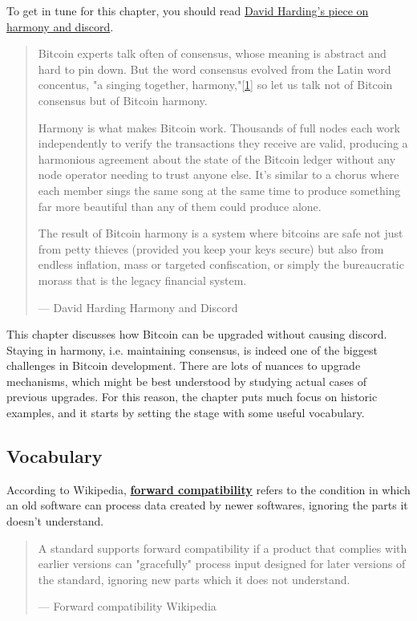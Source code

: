 To get in tune for this chapter, you should read
\href{https://bitcointalk.org/dec/p1.html}{David Harding's piece on
harmony and discord}.

\begin{quote}
Bitcoin experts talk often of consensus, whose meaning is abstract and
hard to pin down. But the word consensus evolved from the Latin word
concentus, "a singing together,
harmony,"{[}\href{https://bitcointalk.org/dec/p1.html\#ftnt1}{1}{]} so
let us talk not of Bitcoin consensus but of Bitcoin harmony.

Harmony is what makes Bitcoin work. Thousands of full nodes each work
independently to verify the transactions they receive are valid,
producing a harmonious agreement about the state of the Bitcoin ledger
without any node operator needing to trust anyone else. It's similar to
a chorus where each member sings the same song at the same time to
produce something far more beautiful than any of them could produce
alone.

The result of Bitcoin harmony is a system where bitcoins are safe not
just from petty thieves (provided you keep your keys secure) but also
from endless inflation, mass or targeted confiscation, or simply the
bureaucratic morass that is the legacy financial system.

---  David Harding Harmony and Discord
\end{quote}

This chapter discusses how Bitcoin can be upgraded without causing
discord. Staying in harmony, i.e. maintaining consensus, is indeed one
of the biggest challenges in Bitcoin development. There are lots of
nuances to upgrade mechanisms, which might be best understood by
studying actual cases of previous upgrades. For this reason, the chapter
puts much focus on historic examples, and it starts by setting the stage
with some useful vocabulary.

\hypertarget{_vocabulary}{%
\subsection{Vocabulary}\label{_vocabulary}}

According to Wikipedia,
\href{https://en.wikipedia.org/wiki/Forward_compatibility}{\textbf{forward
compatibility}} refers to the condition in which an old software can
process data created by newer softwares, ignoring the parts it doesn't
understand.

\begin{quote}
A standard supports forward compatibility if a product that complies
with earlier versions can "gracefully" process input designed for later
versions of the standard, ignoring new parts which it does not
understand.

---  Forward compatibility Wikipedia
\end{quote}

